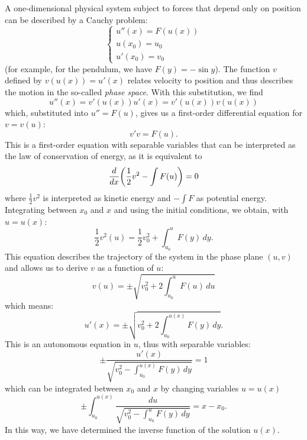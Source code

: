 \begin{example}
%
%
A one-dimensional physical system subject to forces that depend only on position
can be described by a Cauchy problem:
\[
\begin{cases}
  u''(x) = F(u(x)) \\
  u(x_0) = u_0 \\
  u'(x_0) = v_0
\end{cases}
\]
(for example, for the pendulum, we have $F(y) = -\sin y$).
The function $v$ defined by $v(u(x)) = u'(x)$ relates velocity to position and
thus describes the motion in the so-called \emph{phase space}. With this
substitution, we find
\[
  u''(x) = v'(u(x)) u'(x) = v'(u(x)) v(u(x))
\]
which, substituted into $u'' = F(u)$, gives us a first-order differential
equation for $v=v(u)$:
\[
 v' v  = F(u).
\]
This is a first-order equation with separable variables that can be interpreted
as the law of conservation of energy, as it is equivalent to
\[
  \frac{d}{dx}{\left( \frac 1 2 v^2 - \int F(u) \right)} = 0
\]
where $\frac 1 2 v^2$ is interpreted as kinetic energy and $-\int F$ as
potential energy.
Integrating between $x_0$ and $x$ and using the initial conditions, we obtain,
with $u=u(x)$:
\[
  \frac 1 2 v^2(u) = \frac 1 2 v_0^2 + \int_{u_0}^{u} F(y)\, dy.
\]
This equation describes the trajectory of the system in the phase plane $(u,v)$
and allows us to derive $v$ as a function of $u$:
\[
  v(u) = \pm\sqrt{v_0^2 + 2\int_{u_0}^u F(u)\, du}
\]
which means:
\begin{equation}\label{eq:8844475}
  u'(x) = \pm \sqrt{v_0^2 + 2 \int_{u_0}^{u(x)} F(y)\, dy}.
\end{equation}
This is an autonomous equation in $u$, thus with separable variables:
\[
  \pm\frac{u'(x)}{\sqrt{v_0^2 - \int_{u_0}^{u(x)} F(y)\, dy}} = 1
\]
which can be integrated between $x_0$ and $x$ by changing variables $u=u(x)$
\[
  \pm\int_{u_0}^{u(x)} \frac{du}{\sqrt{v_0^2-\int_{u_0}^u F(y)\, dy}} = x-x_0.
\]
In this way, we have determined the inverse function of the solution $u(x)$.
\end{example}

